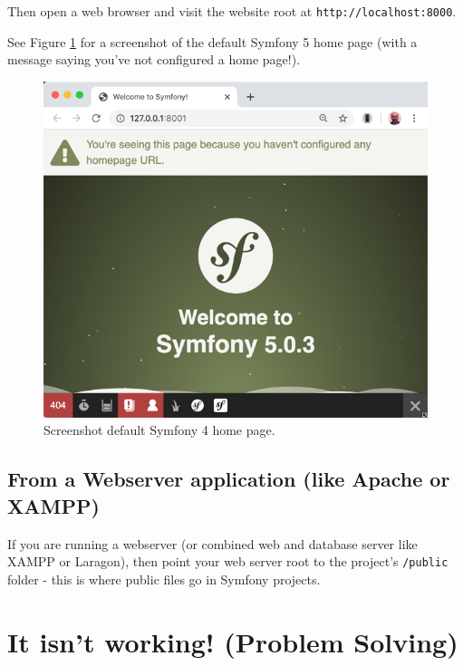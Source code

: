\documentclass[a4paperpaper,openright]{book}
\begin{document}
Then open a web browser and visit the website root at
\texttt{http://localhost:8000}.

See Figure \ref{default_home_page} for a screenshot of the default
Symfony 5 home page (with a message saying you've not configured a home
page!).

\begin{figure}
\centering
\includegraphics{./tex2pdf.-65f13e14688ab55b/271098101c6e08a7fad30eb75ff110e370abc4c2.png}
\caption{Screenshot default Symfony 4 home page.
\label{default_home_page}}
\end{figure}

\hypertarget{from-a-webserver-application-like-apache-or-xampp}{%
\subsection{From a Webserver application (like Apache or
XAMPP)}\label{from-a-webserver-application-like-apache-or-xampp}}

If you are running a webserver (or combined web and database server like
XAMPP or Laragon), then point your web server root to the project's
\texttt{/public} folder - this is where public files go in Symfony
projects.

\hypertarget{it-isnt-working-problem-solving}{%
\section{It isn't working! (Problem
Solving)}\label{it-isnt-working-problem-solving}}
\end{document}
